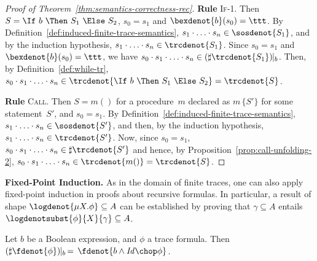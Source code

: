 \documentclass[a4paper,numberwithinsect]{lipics-v2021}
\begin{document}
\begin{proof}[Proof of Theorem~\ref{thm:semantics-correctness-rec}]

\noindent\textbf{Rule} \textsc{If-1}. 
%
Then $S = \If\ b\ \Then\ S_1\ \Else\ S_2$, $s_0 = s_1$ and
$\bexdenot{b} (s_0) = \ttt$.
%
By Definition~\ref{def:induced-finite-trace-semantics},
$s_1 \cdot \ldots \cdot s_n \in \sosdenot{S_1}$,
and by the induction hypothesis, 
$s_1 \cdot \ldots \cdot s_n \in \trcdenot{S_1}$.
%
Since $s_0 = s_1$ and $\bexdenot{b} (s_0) = \ttt$, we have
$s_0 \cdot s_1 \cdot \ldots \cdot s_n \in 
 (\sharp \trcdenot{S_1}) \!\!\mid_b$.
Then, by Definition~\ref{def:while-tr},
$s_0 \cdot s_1 \cdot \ldots \cdot s_n \in 
 \trcdenot{\If\ b\ \Then\ S_1\ \Else\ S_2}=\trcdenot{S}$.

\noindent\textbf{Rule} \textsc{Call}. 
%
Then $S = m ()$ for a procedure~$m$ declared as $m\, \{S'\}$ for some
statement~$S'$, and $s_0 = s_1$.
%
By Definition~\ref{def:induced-finite-trace-semantics}, 
$s_1 \cdot \ldots \cdot s_n \in \sosdenot{S'}$, and then, by the
induction hypothesis, $s_1 \cdot \ldots \cdot s_n \in \trcdenot{S'}$.
%
Now, since $s_0 = s_1$, 
$s_0 \cdot s_1 \cdot \ldots \cdot s_n \in \sharp \trcdenot{S'}$ 
and hence, by Proposition~\ref{prop:call-unfolding-2},
$s_0 \cdot s_1 \cdot \ldots \cdot s_n \in \trcdenot{m ()}=\trcdenot{S}$. 

\end{proof}

\noindent\textbf{Fixed-Point Induction.}
%
As in the domain of finite traces,
one can also apply
fixed-point induction in proofs about recursive formulas.
%
In particular, a result of shape $\logdenot{\mu X. \phi} \subseteq A$
can be established by proving that $\gamma \subseteq A$ entails
$\logdenotsubst{\phi}{X}{\gamma} \subseteq A$.

\begin{proposition}
  \label{prop:state-restr}
  Let $b$ be a Boolean expression, and $\phi$ a trace formula. Then
  $
    (\sharp\fdenot{\phi})\!\!\mid_b\,=\,\fdenot{b\land\mathit{Id}\chop\phi}
  $.
\end{proposition}
\end{document}
